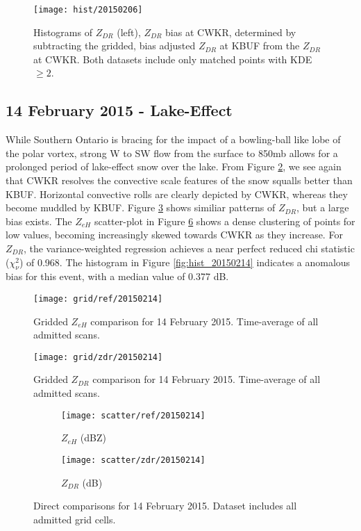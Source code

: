 \begin{figure}[H]
\texttt{[image: hist/20150206]}\centering
\caption{Histograms of $Z_{DR}$ (left), $Z_{DR}$ bias at CWKR, determined by subtracting the gridded, bias adjusted $Z_{DR}$ at KBUF from the $Z_{DR}$ at
CWKR. Both datasets include only matched points with KDE $\geq 2$. } 
\label{fig:hist_20150206}
\end{figure}

\subsection{14 February 2015 - Lake-Effect}
While Southern Ontario is bracing for the impact of a bowling-ball like lobe of the polar vortex, strong W to SW flow from the surface to 850mb allows for a prolonged period of lake-effect snow over the lake. From Figure \ref{fig:grid_ref_20150214}, we see again that CWKR resolves the convective scale features of the snow squalls better than KBUF. Horizontal convective rolls are clearly depicted by CWKR, whereas they become muddled by KBUF. Figure \ref{fig:grid_zdr_20150214} shows similiar patterns of $Z_{DR}$, but a large bias exists. The $Z_{eH}$ scatter-plot in Figure \ref{fig:scatter_20150214} shows a dense clustering of points for low values, becoming increasingly skewed towards CWKR as they increase. For $Z_{DR}$, the variance-weighted regression achieves a near perfect reduced chi statistic ($\chi^2_\nu$) of 0.968. The histogram in Figure \ref{fig:hist_20150214} indicates a anomalous bias for this event, with a median value of 0.377 dB.

\begin{figure}[p]
\texttt{[image: grid/ref/20150214]}
\caption{Gridded $Z_{eH}$ comparison for 14 February 2015. Time-average of all admitted scans.} 
\label{fig:grid_ref_20150214}
\end{figure}

\begin{figure}[p]
\texttt{[image: grid/zdr/20150214]}
\caption{Gridded $Z_{DR}$ comparison for 14 February 2015. Time-average of all admitted scans.} 
\label{fig:grid_zdr_20150214}
\end{figure}

\begin{figure}[p]
\centering
   \begin{subfigure}{0.49\linewidth} \centering
     \texttt{[image: scatter/ref/20150214]}
     \caption{$Z_{eH}$ (dBZ)}\label{fig:scatter_ref_20150214}
   \end{subfigure}
   \begin{subfigure}{0.49\linewidth} \centering
     \texttt{[image: scatter/zdr/20150214]}
     \caption{$Z_{DR}$ (dB)}\label{fig:scatter_zdr_20150214}
   \end{subfigure}
\caption{Direct comparisons for 14 February 2015. Dataset includes all admitted grid cells.} \label{fig:scatter_20150214}
\end{figure}

